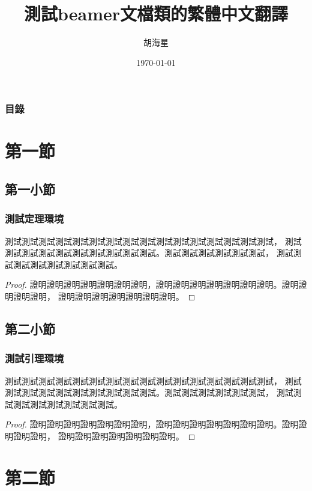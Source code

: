 \documentclass[10pt,serif,t]{beamer}
\title{\heiti{}測試beamer文檔類的繁體中文翻譯}
\author{\songti{}胡海星}
\institute{\kaishu{}計算機科學與技術系\\
           南京大學}
\date{\today}
\begin{document}

\begin{frame}
    \titlepage
\end{frame}

\begin{frame}
  \frametitle{目錄}
  \tableofcontents
\end{frame}

\section{第一節}

\subsection{第一小節}

\begin{frame}
  \frametitle{測試定理環境}
  \begin{theorem}
    測試測試測試測試測試測試測試測試測試測試測試測試測試測試測試測試，
    測試測試測試測試測試測試測試測試測試測試。測試測試測試測試測試測試，
    測試測試測試測試測試測試測試測試。
  \end{theorem}
  \begin{proof}
    證明證明證明證明證明證明證明，證明證明證明證明證明證明證明。證明證明證明證明，
    證明證明證明證明證明證明證明。
  \end{proof}
\end{frame}

\subsection{第二小節}

\begin{frame}
  \frametitle{測試引理環境}
  \begin{lemma}
    測試測試測試測試測試測試測試測試測試測試測試測試測試測試測試測試，
    測試測試測試測試測試測試測試測試測試測試。測試測試測試測試測試測試，
    測試測試測試測試測試測試測試測試。
  \end{lemma}
  \begin{proof}
    證明證明證明證明證明證明證明，證明證明證明證明證明證明證明。證明證明證明證明，
    證明證明證明證明證明證明證明。
  \end{proof}
\end{frame}

\section{第二節}
\end{document}
